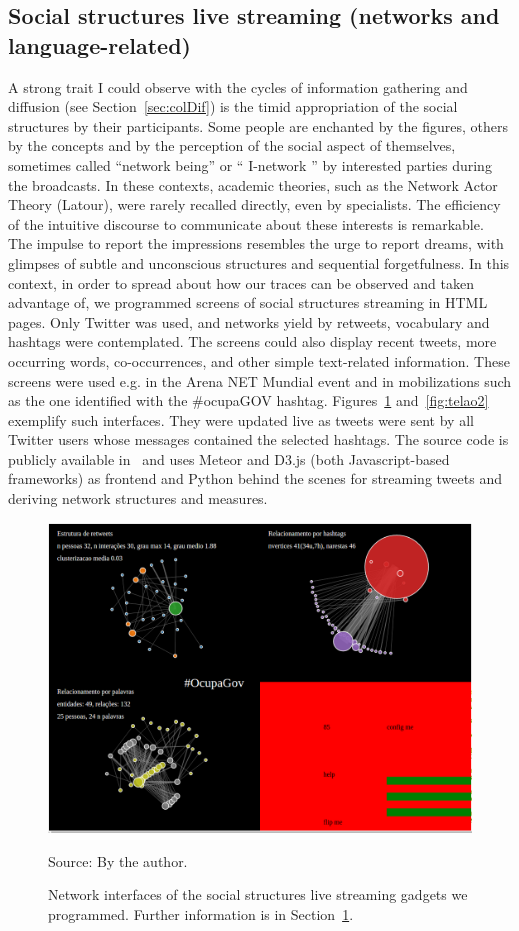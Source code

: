 \begin{apendicesenv}
\section{Social structures live streaming (networks and language-related)}\label{sec:sss}
A strong trait I could observe with the cycles of information gathering and diffusion (see Section~\ref{sec:colDif})
is the timid appropriation of the social structures by their participants.
Some people are enchanted by the figures,
others by the concepts and by the perception of the social aspect of themselves,
sometimes called ``network being'' or `` I-network '' by interested parties during the broadcasts.
In these contexts, academic theories, such as the Network Actor Theory (Latour),
were rarely recalled directly, even by specialists.
The efficiency of the intuitive discourse to communicate about these interests is remarkable.
The impulse to report the impressions resembles the urge to report dreams,
with glimpses of subtle and unconscious structures and sequential forgetfulness.
In this context, in order to spread about how our traces can be observed and taken advantage of,
we programmed screens of social structures streaming in HTML pages.
Only Twitter was used, and networks yield by retweets, vocabulary and hashtags were contemplated.
The screens could also display recent tweets, more occurring words, co-occurrences,
and other simple text-related information.
These screens were used e.g. in the Arena NET Mundial event
and in mobilizations such as the one identified with the \#ocupaGOV hashtag.
Figures~\ref{fig:telao1} and~\ref{fig:telao2} exemplify such interfaces.
They were updated live as tweets were sent by all Twitter users whose messages
contained the selected hashtags.
The source code is publicly available in~\cite{teloes} and uses Meteor and D3.js (both Javascript-based frameworks)
as frontend and
Python behind the scenes for streaming tweets and deriving network structures and measures.

\begin{figure}[H]
  \centering
    \includegraphics[width=.85\textwidth]{figs/telao1.png}
  \caption{Network interfaces of the social structures live streaming gadgets we programmed.
	Further information is in Section~\ref{sec:sss}.}\label{fig:telao1}
\begin{flushleft}\footnotesize
Source: By the author.\
\end{flushleft}
\end{figure}


\end{apendicesenv}
